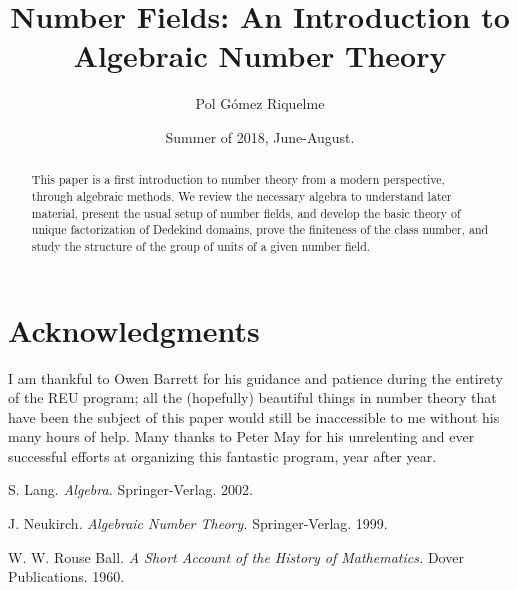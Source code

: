 \documentclass[psamsfonts]{amsart}
\title{Number Fields: An Introduction to Algebraic Number Theory}
\author{Pol Gómez Riquelme}
\date{Summer of 2018, June-August.}
\theoremstyle{definition}
\theoremstyle{remark}
\numberwithin{equation}{section}
\begin{document}
\begin{abstract}

This paper is a first introduction to number theory from a modern perspective, through algebraic methods. We review the necessary algebra to understand later material, present the usual setup of number fields, and develop the basic theory of unique factorization of Dedekind domains, prove the finiteness of the class number, and study the structure of the group of units of a given number field.

\end{abstract}

\maketitle

\tableofcontents











\section*{Acknowledgments}
I am thankful to Owen Barrett for his guidance and patience during the entirety of the REU program; all the (hopefully) beautiful things in number theory that have been the subject of this paper would still be inaccessible to me without his many hours of help. Many thanks to Peter May for his unrelenting and ever successful efforts at organizing this fantastic program, year after year.

\begin{thebibliography}{9}

S. Lang.
\emph{Algebra.}
Springer-Verlag. 2002.

J. Neukirch.
\emph{Algebraic Number Theory.}
Springer-Verlag. 1999.

W. W. Rouse Ball.
\emph{A Short Account of the History of Mathematics.}
Dover Publications. 1960.

\end{thebibliography}
\end{document}
